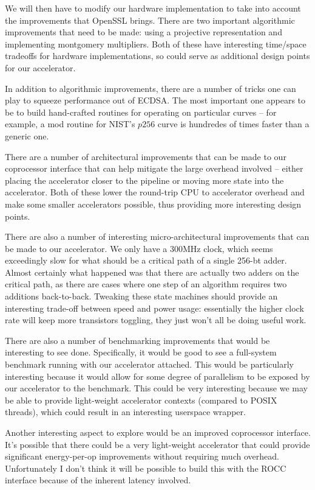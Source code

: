 \documentclass[twocolumn]{article}
\begin{document}
We will then have to modify our hardware implementation to take into
account the improvements that OpenSSL brings.  There are two important
algorithmic improvements that need to be made: using a projective
representation and implementing montgomery multipliers.  Both of these
have interesting time/space tradeoffs for hardware implementations, so
could serve as additional design points for our accelerator.

In addition to algorithmic improvements, there are a number of tricks
one can play to squeeze performance out of ECDSA.  The most important
one appears to be to build hand-crafted routines for operating on
particular curves -- for example, a mod routine for NIST's $p256$
curve is hundredes of times faster than a generic
one\cite{nist-routines}.

There are a number of architectural improvements that can be made to
our coprocessor interface that can help mitigate the large overhead
involved -- either placing the accelerator closer to the pipeline or
moving more state into the accelerator.  Both of these lower the
round-trip CPU to accelerator overhead and make some smaller
accelerators possible, thus providing more interesting design points.

There are also a number of interesting micro-architectural
improvements that can be made to our accelerator.  We only have a
300MHz clock, which seems exceedingly slow for what should be a
critical path of a single 256-bt adder.  Almost certainly what
happened was that there are actually two adders on the critical path,
as there are cases where one step of an algorithm requires two
additions back-to-back.  Tweaking these state machines should provide
an interesting trade-off between speed and power usage: essentially
the higher clock rate will keep more transistors toggling, they just
won't all be doing useful work.

There are also a number of benchmarking improvements that would be
interesting to see done.  Specifically, it would be good to see a
full-system benchmark running with our accelerator attached.  This
would be particularly interesting because it would allow for some
degree of parallelism to be exposed by our accelerator to the
benchmark.  This could be very interesting because we may be able to
provide light-weight accelerator contexts (compared to POSIX threads),
which could result in an interesting userspace wrapper.

Another interesting aspect to explore would be an improved coprocessor
interface.  It's possible that there could be a very light-weight
accelerator that could provide significant energy-per-op improvements
without requiring much overhead.  Unfortunately I don't think it will
be possible to build this with the ROCC interface because of the
inherent latency involved.
\end{document}
